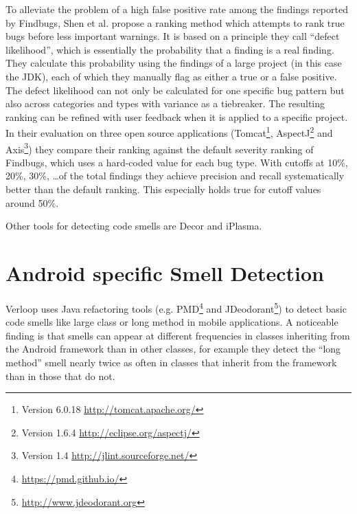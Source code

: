 To alleviate the problem of a high false positive rate among the findings reported by Findbugs, Shen et al. \cite{shen2011efindbugs} propose a ranking method which attempts to rank true bugs before less important warnings.
It is based on a principle they call ``defect likelihood'', which is essentially the probability that a finding is a real finding.
They calculate this probability using the findings of a large project (in this case the JDK), each of which they manually flag as either a true or a false positive.
The defect likelihood can not only be calculated for one specific bug pattern but also across categories and types with variance as a tiebreaker.
The resulting ranking can be refined with user feedback when it is applied to a specific project.
In their evaluation on three open source applications
(Tomcat\footnote{Version 6.0.18 \url{http://tomcat.apache.org/}}, AspectJ\footnote{Version 1.6.4 \url{http://eclipse.org/aspectj/}} and Axis\footnote{Version 1.4 \url{http://jlint.sourceforge.net/}})
they compare their ranking against the default severity ranking of Findbugs, which uses a hard-coded value for each bug type.
With cutoffs at 10\%, 20\%, 30\%, \ldots of the total findings they achieve precision and recall systematically better than the default ranking.
This especially holds true for cutoff values around 50\%.


Other tools for detecting code smells are Decor\cite{moha2010decor} and iPlasma\cite{Marinescu2005iPlasmaAI}.

\section{Android specific Smell Detection}


Verloop \cite{verloop2013code} uses Java refactoring tools (e.g. PMD\footnote{\url{https://pmd.github.io/}} and JDeodorant\footnote{\url{http://www.jdeodorant.org}}) to detect basic code smells like large class or long method in mobile applications.
A noticeable finding is that smells can appear at different frequencies in classes inheriting from the Android framework than in other classes, for example
they detect the ``long method'' smell nearly twice as often in classes that inherit from the framework than in those that do not.

